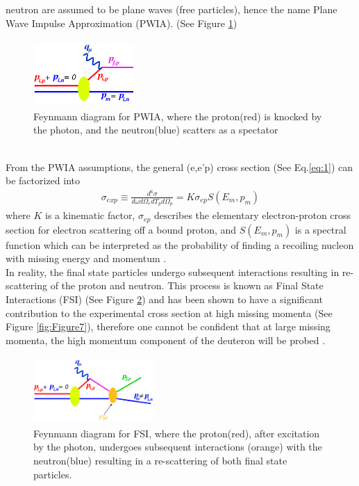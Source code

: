 \documentclass[8pt, twocolumn]{article}
\begin{document}
neutron are assumed to be plane waves (free particles), hence the name Plane Wave Impulse Approximation (PWIA). (See Figure \ref{fig:Figure2}) 
\begin{figure}[h]
  \centering
  \includegraphics[width=1.5in, height=1in]{PWIA.pdf}
  \caption{Feynmann diagram for PWIA, where the proton(red) is knocked by the photon, and the
neutron(blue) scatters as a spectator}
  \label{fig:Figure2}
\end{figure} \\  
\noindent From the PWIA assumptions, the general (e,e'p) cross section (See Eq.\ref{eq:1}) can be factorized into
\begin{equation} \label{eq:2}
\begin{aligned}
\sigma_{exp}\equiv\frac{d^{6}\sigma}{d\omega d\Omega_{e}dT_{p}d\Omega_{p}} = K \sigma_{ep} S(E_{m}, p_{m}) 
\end{aligned}
\end{equation}
where $K$ is a kinematic factor, $\sigma_{ep}$ describes the elementary electron-proton cross section
for electron scattering off a bound proton, and $S(E_{m},p_{m})$ is a spectral function which
can be interpreted as the probability of finding a recoiling nucleon with missing energy and 
momentum \cite{hari}. \\
\indent In reality, the final state particles undergo subsequent interactions resulting in re-scattering of the proton and neutron.
This process is known as Final State Interactions (FSI) (See Figure \ref{fig:Figure3}) and has been shown to have a significant contribution
to the experimental cross section at high missing momenta (See Figure \ref{fig:Figure7}), therefore one cannot be confident that at
large missing momenta, the high momentum component of the deuteron will be probed \cite{ibrahim}.
\begin{figure}[h]
  \centering
  \includegraphics[width=1.8in, height=1in]{FSI.pdf}
  \caption{Feynmann diagram for FSI, where the proton(red), after excitation by the photon, 
undergoes subsequent interactions (orange) with the neutron(blue) resulting in a re-scattering
of both final state particles.}
  \label{fig:Figure3}
\end{figure} \\
\end{document}
